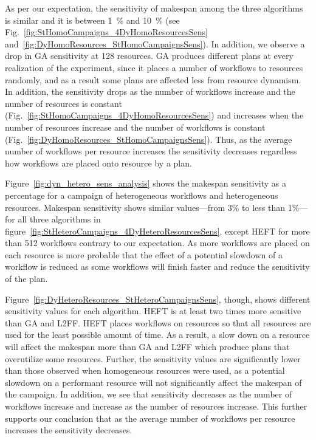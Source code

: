 As per our expectation, the sensitivity of makespan among the three algorithms 
is similar and it is between 1~\% and 10~\% (see 
Fig.~\ref{fig:StHomoCampaigns_4DyHomoResourcesSens} 
and~\ref{fig:DyHomoResources_StHomoCampaignsSens}). In addition, we observe a 
drop in GA sensitivity at 128 resources. GA produces different plans at every 
realization of the experiment, since it places a number of workflows to 
resources randomly, and as a result some plans are affected less from resource 
dynamism. In addition, the sensitivity drops as the number of workflows 
increase and the number of resources is constant 
(Fig.~\ref{fig:StHomoCampaigns_4DyHomoResourcesSens}) and increases when the 
number of resources increase and the number of workflows is constant 
(Fig.~\ref{fig:DyHomoResources_StHomoCampaignsSens}). Thus, as the average 
number of workflows per resource increases the sensitivity decreases 
regardless how workflows are placed onto resource by a plan.

Figure~\ref{fig:dyn_hetero_sens_analysis} shows the makespan sensitivity as a 
percentage for a campaign of heterogeneous workflows and heterogeneous 
resources. Makespan sensitivity shows similar values---from 3\% to less than 
1\%---for all three algorithms in 
figure~\ref{fig:StHeteroCampaigns_4DyHeteroResourcesSens}, except HEFT for 
more than 512 workflows contrary to our expectation. As more workflows are 
placed on each resource is more probable that the effect of a potential 
slowdown of a workflow is reduced as some workflows will finish faster and 
reduce the sensitivity of the plan.

Figure~\ref{fig:DyHeteroResources_StHeteroCampaignsSens}, though, shows 
different sensitivity values for each algorithm. HEFT is at least two times 
more sensitive than GA and L2FF. HEFT places workflows on resources so that 
all resources are used for the least possible amount of time. As a result, a 
slow down on a resource will affect the makespan more than GA and L2FF which 
produce plans that overutilize some resources. Further, the sensitivity values 
are significantly lower than those observed when homogeneous resources were 
used, as a potential slowdown on a performant resource will not significantly 
affect the makespan of the campaign. In addition, we see that sensitivity 
decreases as the number of workflows increase and increase as the number of 
resources increase. This further supports our conclusion that as the average 
number of workflows per resource increases the sensitivity decreases.

